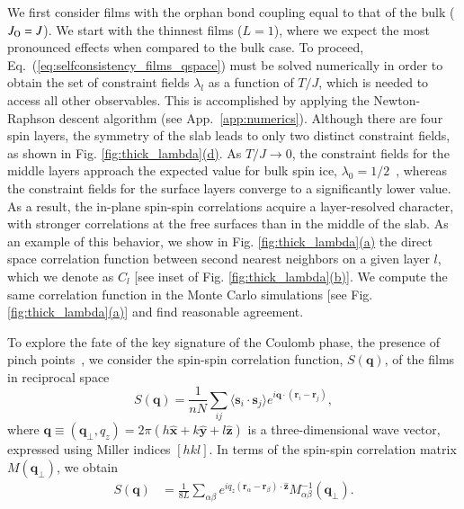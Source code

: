 \documentclass[aps,prx,reprint,runinaddress,superscriptaddress,amsmath,amssymb,floatfix,longbibliography]{revtex4-1}
\def \la {\langle}
\def \ra {\rangle}
\renewcommand{\vec}[1]{\boldsymbol{#1}}
\newcommand{\vhat}[1]{\vec{\hat{#1}}}
\newcommand{\mat}[1]{#1}
\newcommand{\Jo}{J_{\rm O}}
\newcommand{\lambdabulk}{\lambda_0}
\newcommand{\subref}[2]{\ref{#1}\hyperref[#1]{#2}}
\begin{document}
We first consider films with the orphan bond coupling equal to that of the bulk ($\Jo = J$). We start with the thinnest films ($L=1$), where we expect the most pronounced effects when compared to the bulk case. To proceed, Eq.~(\ref{eq:selfconsistency_films_qspace}) must be solved numerically in order to obtain the set of constraint fields $\lambda_l$ as a function of $T/J$, which is needed to access all other observables. This is accomplished by applying the Newton-Raphson descent algorithm (see App.~\ref{app:numerics}). Although there are four spin layers, the symmetry of the slab leads to only two distinct constraint fields, as shown in Fig. \subref{fig:thick_lambda}{(d)}. As $T/J \rightarrow 0$, the constraint fields for the middle layers approach the expected value for bulk spin ice, $\lambdabulk = 1/2$~\cite{Isakov2004}, whereas the constraint fields for the surface layers converge to a significantly lower value. As a result, the in-plane spin-spin correlations acquire a layer-resolved character, with stronger correlations at the free surfaces than in the middle of the slab. As an example of this behavior, we show in Fig. \subref{fig:thick_lambda}{(a)} the direct space correlation function between second nearest neighbors on a given layer $l$, which we denote as $C_l$ [see inset of Fig. \subref{fig:thick_lambda}{(b)}]. We compute the same correlation function in the Monte Carlo simulations [see Fig. \subref{fig:thick_lambda}{(a)}] and find reasonable agreement.

To explore the fate of the key signature of the Coulomb phase, the presence of pinch points~\cite{Henley2005,Henley2010,Castelnovo_AnnRevCMP}, we consider the spin-spin correlation function, $S({\vec {q}})$, of the films  in reciprocal space
\begin{equation}
S({\vec{q}}) = \frac{1}{n N} \sum_{ij} \la \vec{s}_i \cdot \vec{s}_j \ra e^{i \vec{q} \cdot (\vec{r}_i - \vec{r}_j )},
\end{equation} 
where $\vec{q} \equiv (\vec{q}_\perp, q_z) = 2\pi (h\vhat{x}+k\vhat{y}+l\vhat{z})$ is a three-dimensional wave vector, expressed using Miller indices $[hkl]$. In terms of the spin-spin correlation matrix $\mat{M}(\vec{q}_\perp)$, we obtain
%
\begin{align}
S({\vec{q}}) &= \frac{1}{8L} \sum_{\alpha\beta} e^{ i q_z ( \vec{r}_\alpha - \vec{r}_\beta) \cdot \vec{\hat{z}} }  
M_{\alpha \beta}^{-1}({\vec{q}_\perp}) .
\label{eq:SF_largeN}
\end{align}
\end{document}
